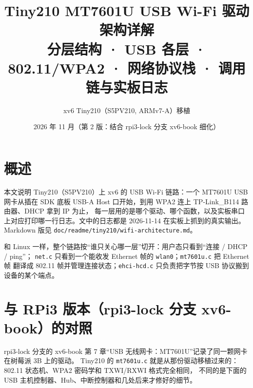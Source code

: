 \documentclass[UTF8,zihao=-4,fontset=none]{ctexart}
\title{\textbf{Tiny210 MT7601U USB Wi-Fi 驱动架构详解}\\[2mm]
\large 分层结构 · USB 各层 · 802.11/WPA2 · 网络协议栈 · 调用链与实板日志}
\author{xv6 Tiny210（S5PV210, ARMv7-A）移植}
\date{2026 年 11 月（第 2 版：结合 rpi3-lock 分支 xv6-book 细化）}
\newcommand{\fn}[1]{\texttt{#1}}
\begin{document}
\maketitle
\tableofcontents
\newpage

\section{概述}

本文说明 Tiny210（S5PV210）上 xv6 的 USB Wi-Fi 链路：一个 MT7601U USB 网卡从插在
SDK 底板 USB-A Host 口开始，到用 WPA2 连上 TP-Link\_B114 路由器、DHCP 拿到 IP 为止，
每一层用的是哪个驱动、哪个函数，以及实板串口上对应打印哪一行日志。文中的日志都是
2026-11-14 在实板上抓到的真实输出。Markdown 版见
\fn{doc/readme/tiny210/wifi-architecture.md}。

和 Linux 一样，整个链路按“谁只关心哪一层”切开：用户态只看到“连接 / DHCP / ping”；
\fn{net.c} 只看到一个能收发 Ethernet 帧的 \fn{wlan0}；\fn{mt7601u.c} 把 Ethernet 帧
翻译成 802.11 帧并管理连接状态；\fn{ehci-hcd.c} 只负责把字节按 USB 协议搬到设备的某个端点。

\section{与 RPi3 版本（rpi3-lock 分支 xv6-book）的对照}\label{sec:rpi}

rpi3-lock 分支的 xv6-book 第 7 章“USB 无线网卡：MT7601U”记录了同一颗网卡在树莓派 3B 上的驱动。
Tiny210 的 \fn{mt7601u.c} 就是从那份驱动移植过来的：802.11 状态机、WPA2 密码学和 TXWI/RXWI 格式完全相同，
不同的是下面的 USB 主机控制器、Hub、中断控制器和几处后来才修好的细节。
\end{document}
